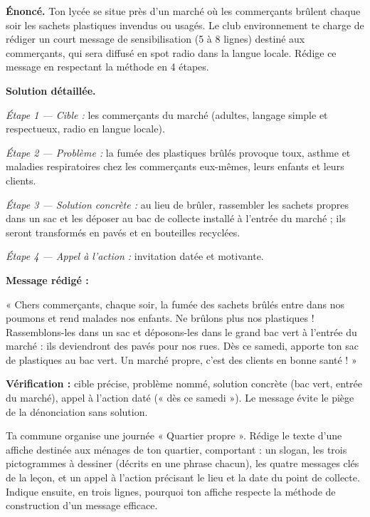 \documentclass[11pt]{article}
\begin{document}
\begin{exoresolu}
\textbf{Énoncé.} Ton lycée se situe près d'un marché où les commerçants brûlent chaque soir les sachets plastiques invendus ou usagés. Le club environnement te charge de rédiger un court message de sensibilisation (5 à 8 lignes) destiné aux commerçants, qui sera diffusé en spot radio dans la langue locale. Rédige ce message en respectant la méthode en 4 étapes.

\tcblower
\textbf{Solution détaillée.}

\emph{Étape 1 — Cible :} les commerçants du marché (adultes, langage simple et respectueux, radio en langue locale).

\emph{Étape 2 — Problème :} la fumée des plastiques brûlés provoque toux, asthme et maladies respiratoires chez les commerçants eux-mêmes, leurs enfants et leurs clients.

\emph{Étape 3 — Solution concrète :} au lieu de brûler, rassembler les sachets propres dans un sac et les déposer au bac de collecte installé à l'entrée du marché ; ils seront transformés en pavés et en bouteilles recyclées.

\emph{Étape 4 — Appel à l'action :} invitation datée et motivante.

\textbf{Message rédigé :}

« Chers commerçants, chaque soir, la fumée des sachets brûlés entre dans nos poumons et rend malades nos enfants. Ne brûlons plus nos plastiques ! Rassemblons-les dans un sac et déposons-les dans le grand bac vert à l'entrée du marché : ils deviendront des pavés pour nos rues. Dès ce samedi, apporte ton sac de plastiques au bac vert. Un marché propre, c'est des clients en bonne santé ! »

\textbf{Vérification :} cible précise, problème nommé, solution concrète (bac vert, entrée du marché), appel à l'action daté (« dès ce samedi »). Le message évite le piège de la dénonciation sans solution.
\end{exoresolu}

\begin{exercice}
Ta commune organise une journée « Quartier propre ». Rédige le texte d'une affiche destinée aux ménages de ton quartier, comportant : un slogan, les trois pictogrammes à dessiner (décrits en une phrase chacun), les quatre messages clés de la leçon, et un appel à l'action précisant le lieu et la date du point de collecte. Indique ensuite, en trois lignes, pourquoi ton affiche respecte la méthode de construction d'un message efficace.
\end{exercice}
\end{document}
